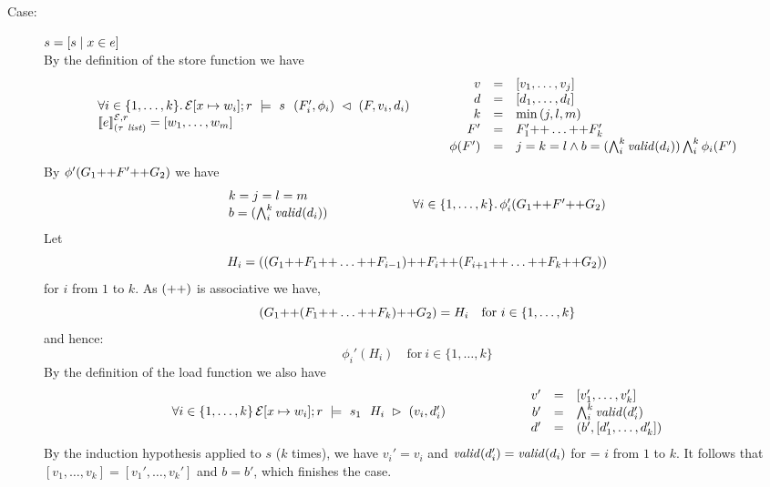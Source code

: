 {\begin{description}
\item[Case:] $s = \SComp{s}{x}{e}$\\[1ex]
By the definition of the store function we have
\[
\begin{array}{l}
\forall i \in \{1,\dots,k\}.\,\store{\Env[x \mapsto w_i]}{F}{r}{v_i,d_i}{s}{F_i',\phi_i}\\
\eval{e}{\Env,r}{(\tau\ \mathit{list})} = [w_1,\dots,w_m ]\\
\end{array}\hspace*{.75cm}\begin{array}{rcl}
v &=& [v_1,\dots,v_j]\\
d &=& [d_1,\dots,d_l]\\
k &=& \min{(j,l,m)}\\
F' &=& F_1' \FAppend \dots \FAppend F_k'\\
\phi(F') &=& j = k = l \wedge b = (\bigwedge_i^k \valid{d_i}) \bigwedge_i^k \phi_i(F')\\
\end{array}
\]
By $\phi'(G_1 \FAppend F' \FAppend G_2)$ we have
\[
\begin{array}{l}
k = j = l = m\\
b = (\bigwedge_i^k \valid{d_i})\\
\end{array}\hspace*{2cm}\begin{array}{l}
\forall i \in \{1,\dots,k\}.\,\phi_i'(G_1 \FAppend F' \FAppend G_2) \\
\end{array}
\]
%
Let
\[
H_i = ((G_1\FAppend F_1\FAppend \dots \FAppend F_{i-1}) \FAppend F_i \FAppend (F_{i+1} \FAppend \dots \FAppend F_k \FAppend G_2))
\]
for $i$ from $1$ to $k$. As $(\FAppend)$ is associative we have,
\[
(G_1\FAppend (F_1\FAppend \dots \FAppend F_k)\FAppend G_2) = H_i \quad \text{for}~i \in \{1,\dots,k\}
\]
and hence:
\[
\phi_i'(H_i) \quad \text{for}~i \in \{1,\dots,k\}
\]
%
By the definition of the load function we also have 
\[ 
\begin{array}{l}
\forall i \in \{1,\dots,k\}\,\load{\Env[ x \mapsto w_i]}{H_i}{r}{s_1}{v_i,d_i'}\\
\end{array}\hspace*{2cm}\begin{array}{rcl}
v' &=& [v_1',\dots,v_k']\\
b' &=& \bigwedge_i^k \valid{d_i'}\\
d' &=& (b',[d_1',\dots,d_k'])\\
\end{array}
\]
%
By the induction hypothesis applied to $s$ ($k$ times), we have $v_i'
= v_i$ and $\valid{d_i'} = \valid{d_i}$ for = $i$ from $1$ to
$k$. It follows that $[v_1,\dots,v_k] = [v_1',\dots,v_k']$ and $b =
b'$, which finishes the case.


\end{description}}
